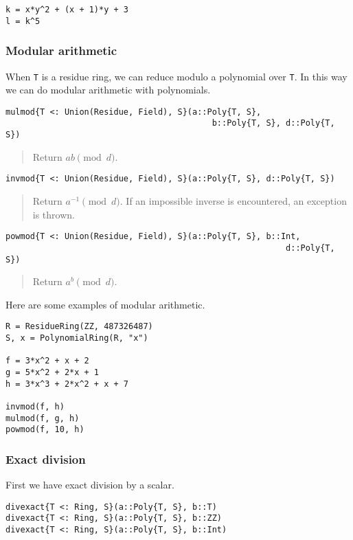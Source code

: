 \documentclass[a4paper,10pt]{article}
\newcommand{\code}{\lstinline}
\newcommand{\desc}[1]{\vspace{-3mm}\begin{quote}#1\end{quote}}
\begin{document}
{{\begin{lstlisting}
k = x*y^2 + (x + 1)*y + 3
l = k^5
\end{lstlisting}

\subsubsection{Modular arithmetic}

When \code{T} is a residue ring, we can reduce modulo a polynomial over
\code{T}. In this way we can do modular arithmetic with polynomials.

\begin{lstlisting}
mulmod{T <: Union(Residue, Field), S}(a::Poly{T, S}, 
                                          b::Poly{T, S}, d::Poly{T, S})
\end{lstlisting}

\desc{Return $ab \pmod{d}$.}

\begin{lstlisting}
invmod{T <: Union(Residue, Field), S}(a::Poly{T, S}, d::Poly{T, S})
\end{lstlisting}

\desc{Return $a^{-1} \pmod{d}$. If an impossible inverse is encountered, an
exception is thrown.}

\begin{lstlisting}
powmod{T <: Union(Residue, Field), S}(a::Poly{T, S}, b::Int, 
                                                         d::Poly{T, S})
\end{lstlisting}

\desc{Return $a^b \pmod{d}$.}

Here are some examples of modular arithmetic.

\begin{lstlisting}
R = ResidueRing(ZZ, 487326487)
S, x = PolynomialRing(R, "x")

f = 3*x^2 + x + 2
g = 5*x^2 + 2*x + 1
h = 3*x^3 + 2*x^2 + x + 7

invmod(f, h)
mulmod(f, g, h)
powmod(f, 10, h)
\end{lstlisting}

\subsubsection{Exact division}

First we have exact division by a scalar.

\begin{lstlisting}
divexact{T <: Ring, S}(a::Poly{T, S}, b::T)
divexact{T <: Ring, S}(a::Poly{T, S}, b::ZZ)
divexact{T <: Ring, S}(a::Poly{T, S}, b::Int)
\end{lstlisting}

}}
\end{document}
